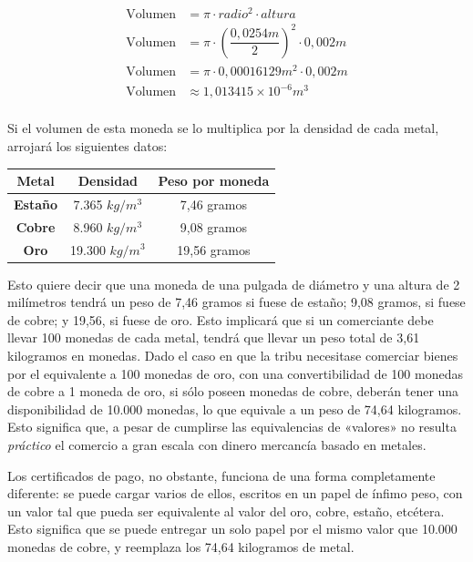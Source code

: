 \documentclass[12pt,a4paper,twoside]{book}
\begin{document}
\begin{align*}
\text{Volumen} &= \pi \cdot radio^{2} \cdot altura \\
\text{Volumen} &= \pi \cdot \left( \dfrac{0,0254m}{2} \right)^{2} \cdot 0,002m \\
\text{Volumen} &= \pi \cdot 0,00016129m^{2} \cdot 0,002m \\
\text{Volumen} & \approx 1,013415 \times 10^{-6} m^{3} \\
\end{align*}

Si el volumen de esta moneda se lo multiplica por la densidad de cada metal, arrojará los siguientes datos:

\begin{center}
\begin{tabular}{|c|c|c|}
\hline 
\textbf{Metal} & \textbf{Densidad} & \textbf{Peso por moneda} \\ 
\hline 
\textbf{Estaño} & 7.365 $ kg/m^{3} $ & 7,46 gramos \\ 
\hline 
\textbf{Cobre} & 8.960 $ kg/m^{3} $ & 9,08 gramos \\ 
\hline 
\textbf{Oro} & 19.300 $ kg/m^{3} $ & 19,56 gramos \\ 
\hline 
\end{tabular} 
\end{center}

Esto quiere decir que una moneda de una pulgada de diámetro y una altura de 2 milímetros tendrá un peso de 7,46 gramos si fuese de estaño; 9,08 gramos, si fuese de cobre; y 19,56, si fuese de oro. Esto implicará que si un comerciante debe llevar 100 monedas de cada metal, tendrá que llevar un peso total de 3,61 kilogramos en monedas. Dado el caso en que la tribu necesitase comerciar bienes por el equivalente a 100 monedas de oro, con una convertibilidad de 100 monedas de cobre a 1 moneda de oro, si sólo poseen monedas de cobre, deberán tener una disponibilidad de 10.000 monedas, lo que equivale a un peso de 74,64 kilogramos. Esto significa que, a pesar de cumplirse las equivalencias de «valores» no resulta \textit{práctico} el comercio a gran escala  con dinero mercancía basado en metales.

Los certificados de pago, no obstante, funciona de una forma completamente diferente: se puede cargar varios de ellos, escritos en un papel de ínfimo peso, con un valor tal que pueda ser equivalente al valor del oro, cobre, estaño, etcétera. Esto significa que se puede entregar un solo papel por el mismo valor que 10.000 monedas de cobre, y reemplaza los 74,64 kilogramos de metal.
\end{document}
